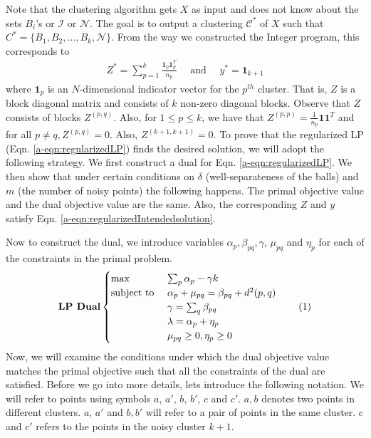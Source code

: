 \documentclass[12pt]{article}
\newcommand{\mc}{\mathcal}
\newcommand{\mb}{\mathbf}
\newcommand\numberthis{\addtocounter{equation}{1}\tag{\theequation}}
\begin{document}
Note that the clustering algorithm gets $X$ as input and does not know about the sets $B_i$'s or $\mc I$ or $\mc N$. The goal is to output a clustering $\mc C^*$ of $X$ such that $C^* = \{B_1, B_2, \ldots, B_k, \mc N\}$. From the way we constructed the Integer program, this corresponds to
\begin{align}
  Z^* = \sum_{p=1}^k \frac{\mb 1_p \mb 1_{p}^T}{n_p} \enspace\enspace\text{ and }\enspace\enspace y^* = \mb 1_{k+1}\label{a-eqn:regularizedIntendedsolution}
\end{align}
where $\mb 1_p$ is an $N$-dimensional indicator vector for the $p^{th}$ cluster. That is, $Z$ is a block diagonal matrix and consists of $k$ non-zero diagonal blocks. Observe that $Z$ consists of blocks $Z^{(p, q)}$. Also, for $1\le p \le k$, we have that $Z^{(p, p)} = \frac{1}{n_p}\mb 1\mb 1^T$ and for all $p \neq q, Z^{(p, q)} = 0$. Also, $Z^{(k+1, k+1)} = 0$. To prove that the regularized LP (Eqn. \ref{a-eqn:regularizedLP}) finds the desired solution, we  will adopt the following strategy. We first construct a dual for Eqn. \ref{a-eqn:regularizedLP}. We then show that under certain conditions on $\delta$ (well-separateness of the balls) and $m$ (the number of noisy points) the following happens. The primal objective value and the dual objective value are the same. Also, the corresponding $Z$ and $y$ satisfy Eqn. \ref{a-eqn:regularizedIntendedsolution}.

Now to construct the dual, we introduce variables $\alpha_p, \beta_{pq}, \gamma$, $\mu_{pq}$ and $\eta_p$ for each of the constraints in the primal problem. 
\[\textbf{LP Dual}
    \begin{cases}
		\max \enspace & \sum_{p} \alpha_{p} -\gamma k\\
		\text{subject to } 
		&\alpha_p + \mu_{pq} = \beta_{pq} + d^2(p, q)\\
		&\gamma = \sum_q \beta_{pq}\\
		&\lambda = \alpha_p + \eta_p \\
		&\mu_{pq} \ge 0, \eta_p \ge 0
	\end{cases}
	\label{a-eqn:resularisedLPDual}
	\numberthis
\]
Now, we will examine the conditions under which the dual objective value matches the primal objective such that all the constraints of the dual are satisfied. Before we go into more details, lets introduce the following notation. We will refer to points using symbols $a$, $a'$, $b$, $b'$, $c$ and $c'$. $a, b$ denotes two points in different clusters. $a$, $a'$ and $b, b'$ will refer to a pair of points in the same cluster. $c$ and $c'$ refers to the points in the noisy cluster $k+1$. 
\end{document}
